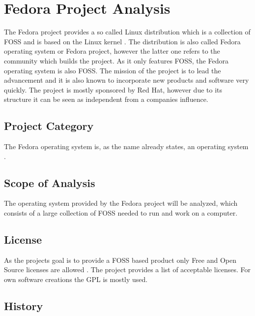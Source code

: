 
\section{Fedora Project Analysis} %


The Fedora project provides a so called Linux distribution which is a
collection of \ac{FOSS} and is based on the Linux kernel
\cite{FedoraAbout,FedoraTogami}. The distribution is also called Fedora
operating system or Fedora project, however the latter one refers to the
community which builds the project. As it only features \ac{FOSS}, the Fedora
operating system is also \ac{FOSS}. The mission of the project is to lead the
advancement and it is also known to incorporate new products and software very
quickly. The project is mostly sponsored by Red Hat, however due to its
structure it can be seen as independent from a companies influence.

\subsection{Project Category}

The Fedora operating system is, as the name already states, an operating system
\cite{FedoraAbout}.

\subsection{Scope of Analysis}

The operating system provided by the Fedora project will be analyzed, which
consists of a large collection of \ac{FOSS} needed to run and work on a
computer.

\subsection{License}

As the projects goal is to provide a \ac{FOSS} based product only Free and Open
Source licenses are allowed \cite{FedoraLicensing}. The project provides a list
of acceptable licenses. For own software creations the \ac{GPL} is mostly used.

\subsection{History}

